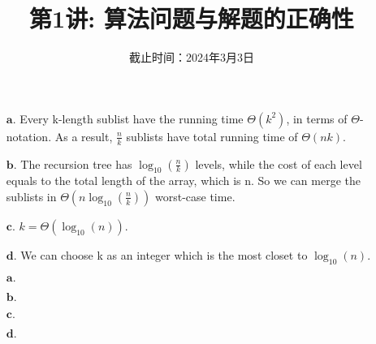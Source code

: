 \documentclass[a4paper, justified]{tufte-handout}
\title{第1讲: 算法问题与解题的正确性}
\date{截止时间：2024年3月3日} %
\newcommand{\lg}{\log_{10}}
\begin{document}
\maketitle
\noplagiarism %

\beginrequired

\begin{problem}[TC Problem $2-1$]
\end{problem}

\begin{solution}
\begin{enumerate}
    \item [$\bm{a.}$] Every k-length sublist have the running time $\Theta(k^{2})$, in terms of $\Theta$-notation. As a result, $\frac{n}{k}$ sublists have total running time of $\Theta(nk)$.
    \item [$\bm{b.}$]  The recursion tree has $\lg (\frac{n}{k})$ levels, while the cost of each level equals to the total length of the array, which is n. So we can merge the sublists in $\Theta(n\lg(\frac{n}{k}))$ worst-case time.
    \item [$\bm{c.}$]  $k = \Theta(\lg(n))$.
    \item [$\bm{d.}$]  We can choose k as an integer which is the most closet to $\lg(n)$.
\end{enumerate}
\end{solution}

\begin{problem}[TC Problem $2-2$]
\end{problem}

\begin{solution}
\begin{enumerate}
    \item [$\bm{a.}$] 
    \item [$\bm{b.}$] 
    \item [$\bm{c.}$] 
    \item [$\bm{d.}$] 
\end{enumerate}
\end{solution}

\begin{problem}[TC Problem $2-3$]
\end{problem}
\end{document}
